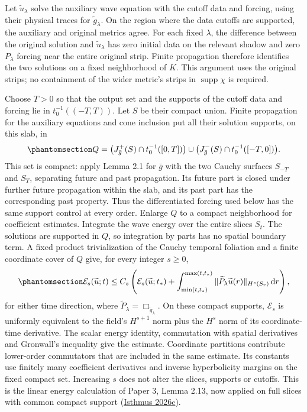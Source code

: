 \documentclass[
  english,
  11pt,
  reqno]{amsart}
\begin{document}
Let \(\widetilde u_\lambda\) solve the auxiliary wave equation with the
cutoff data and forcing, using their physical traces for
\(\widetilde g_\lambda\). On the region where the data cutoffs are
supported, the auxiliary and original metrics agree. For each fixed
\(\lambda\), the difference between the original solution and
\(\widetilde u_\lambda\) has zero initial data on the relevant shadow
and zero \(P_\lambda\) forcing near the entire original strip. Finite
propagation therefore identifies the two solutions on a fixed
neighborhood of \(K\). This argument uses the original strips; no
containment of the wider metric's strips in \(\operatorname{supp}\chi\)
is required.

Choose \(T>0\) so that the output set and the supports of the cutoff
data and forcing lie in \(t_0^{-1}((-T,T))\). Let \(S\) be their compact
union. Finite propagation for the auxiliary equations and cone inclusion
put all their solution supports, on this slab, in
\begin{equation}\protect\phantomsection\label{eq:family-common-propagation-set}{
Q=\bigl(J^+_{\bar g}(S)\cap t_0^{-1}([0,T])\bigr)
\cup\bigl(J^-_{\bar g}(S)\cap t_0^{-1}([-T,0])\bigr).
}\end{equation} This set is compact: apply Lemma 2.1 for \(\bar g\) with
the two Cauchy surfaces \(S_{-T}\) and \(S_T\), separating future and
past propagation. Its future part is closed under further future
propagation within the slab, and its past part has the corresponding
past property. Thus the differentiated forcing used below has the same
support control at every order. Enlarge \(Q\) to a compact neighborhood
for coefficient estimates. Integrate the wave energy over the entire
slices \(S_t\). The solutions are supported in \(Q\), so integration by
parts has no spatial boundary term. A fixed product trivialization of
the Cauchy temporal foliation and a finite coordinate cover of \(Q\)
give, for every integer \(s\ge0\),
\begin{equation}\protect\phantomsection\label{eq:family-local-energy-estimate}{
\mathcal E_s(\widetilde u;t)
\le C_s\left(
\mathcal E_s(\widetilde u;t_*)
+\int_{\min(t,t_*)}^{\max(t,t_*)}
\|\widetilde P_\lambda\widetilde u(r)\|_{H^s(S_r)}\,\mathrm dr
\right),
}\end{equation} for either time direction, where
\(\widetilde P_\lambda=\Box_{\widetilde g_\lambda}\). On these compact
supports, \(\mathcal E_s\) is uniformly equivalent to the field's
\(H^{s+1}\) norm plus the \(H^s\) norm of its coordinate-time
derivative. The scalar energy identity, commutation with spatial
derivatives and Gronwall's inequality give the estimate. Coordinate
partitions contribute lower-order commutators that are included in the
same estimate. Its constants use finitely many coefficient derivatives
and inverse hyperbolicity margins on the fixed compact set. Increasing
\(s\) does not alter the slices, supports or cutoffs. This is the linear
energy calculation of Paper 3, Lemma 2.13, now applied on full slices
with common compact support (\hyperref[ref-IsthmusSmooth2026]{Isthmus
2026c}).
\end{document}
